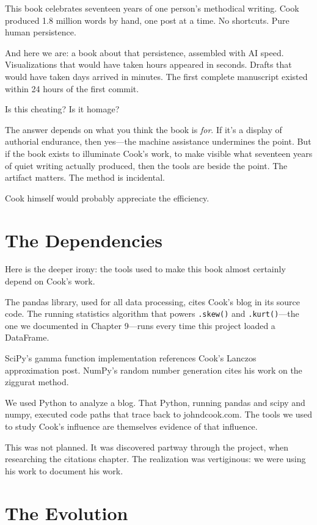 This book celebrates seventeen years of one person's methodical writing. Cook produced 1.8 million words by hand, one post at a time. No shortcuts. Pure human persistence.

And here we are: a book about that persistence, assembled with AI speed. Visualizations that would have taken hours appeared in seconds. Drafts that would have taken days arrived in minutes. The first complete manuscript existed within 24 hours of the first commit.

Is this cheating? Is it homage?

The answer depends on what you think the book is \textit{for}. If it's a display of authorial endurance, then yes---the machine assistance undermines the point. But if the book exists to illuminate Cook's work, to make visible what seventeen years of quiet writing actually produced, then the tools are beside the point. The artifact matters. The method is incidental.

Cook himself would probably appreciate the efficiency.

\bigskip

\section*{The Dependencies}

Here is the deeper irony: the tools used to make this book almost certainly depend on Cook's work.

The pandas library, used for all data processing, cites Cook's blog in its source code. The running statistics algorithm that powers \texttt{.skew()} and \texttt{.kurt()}---the one we documented in Chapter 9---runs every time this project loaded a DataFrame.

SciPy's gamma function implementation references Cook's Lanczos approximation post. NumPy's random number generation cites his work on the ziggurat method.

We used Python to analyze a blog. That Python, running pandas and scipy and numpy, executed code paths that trace back to johndcook.com. The tools we used to study Cook's influence are themselves evidence of that influence.

This was not planned. It was discovered partway through the project, when researching the citations chapter. The realization was vertiginous: we were using his work to document his work.

\bigskip

\section*{The Evolution}

